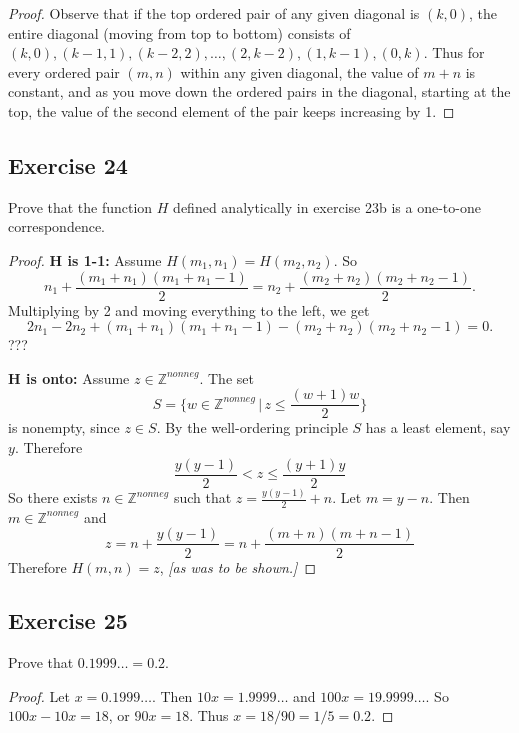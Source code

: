 \documentclass[14pt]{extarticle}
\newcommand{\dps}{\displaystyle}
\newcommand{\Z}{\mathbb{Z}}
\begin{document}
\begin{proof}
    Observe that if the top ordered pair of any given diagonal is $(k, 0)$, the entire diagonal (moving from top to
    bottom) consists of \((k, 0), (k - 1, 1), (k - 2, 2), \ldots, (2, k - 2), (1, k - 1), (0, k)\). Thus for every
    ordered pair \((m, n)\) within any given diagonal, the value of \(m + n\) is constant, and as you move down the
    ordered pairs in the diagonal, starting at the top, the value of the second element of the pair keeps increasing by 1.
\end{proof}

\subsection{Exercise 24}
Prove that the function $H$ defined analytically in exercise 23b is a one-to-one correspondence.

\begin{proof}
    {\bf $\bm{H}$ is 1-1:} Assume \(H(m_1, n_1) = H(m_2, n_2)\). So
    \[
        n_1 + \frac{(m_1 + n_1)(m_1 + n_1 - 1)}{2} = n_2 + \frac{(m_2 + n_2)(m_2 + n_2 - 1)}{2}.
    \]
    Multiplying by 2 and moving everything to the left, we get
    \[
        2n_1 - 2n_2 + (m_1 + n_1)(m_1 + n_1 - 1) - (m_2 + n_2)(m_2 + n_2 - 1) = 0.
    \]
    ???

    {\bf $\bm{H}$ is onto:} Assume \(z \in \Z^{nonneg}\). The set
    \[
        S = \{w \in \Z^{nonneg} \, | \, z \leq \frac{(w+1)w}{2}\}
    \]
    is nonempty, since \(z \in S\). By the well-ordering principle $S$ has a least element, say $y$. Therefore
    \[
        \frac{y(y-1)}{2} < z \leq \frac{(y+1)y}{2}
    \]
    So there exists \(n \in \Z^{nonneg}\) such that \(\dps z = \frac{y(y-1)}{2} + n\). Let \(m = y - n\). Then \(m \in \Z^{nonneg}\) and
    \[
        z = n + \frac{y(y-1)}{2} = n + \frac{(m+n)(m+n-1)}{2}
    \]
    Therefore \(H(m, n) = z\), {\it [as was to be shown.]}
\end{proof}

\subsection{Exercise 25}
Prove that \(0.1999 \ldots = 0.2\).

\begin{proof}
    Let \(x = 0.1999 \ldots\). Then \(10x = 1.9999 \ldots\) and \(100x = 19.9999 \ldots\). So \(100x - 10x = 18\), or
    \(90x = 18\). Thus \(x = 18/90 = 1/5 = 0.2\).
\end{proof}
\end{document}
